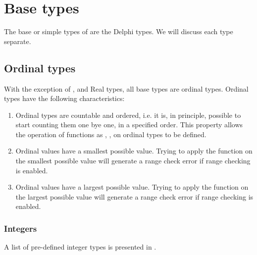 \section{Base types}
The base or simple types of \fpc are the Delphi types.
We will discuss each type separate.

\subsection{Ordinal types}
With the exception of ,  and Real types, 
all base types are ordinal types. Ordinal types have the following 
characteristics:
\begin{enumerate}
\item Ordinal types are countable and ordered, i.e. it is, in principle,
possible to start counting them one bye one, in a specified order.
This property allows the operation of functions as , ,
on ordinal types to be defined.
\item Ordinal values have a smallest possible value. Trying to apply the
 function on the smallest possible value will generate a range
check error if range checking is enabled.
\item Ordinal values have a largest possible value. Trying to apply the
 function on the largest possible value will generate a range
check error if range checking is enabled.
\end{enumerate}
\subsubsection{Integers}
A list of pre-defined integer types is presented in .

